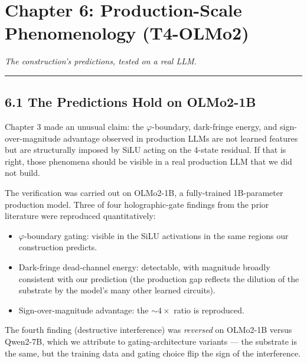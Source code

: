 \documentclass[
  twocolumn,
  10pt,
  a4paper]{article}
\providecommand{\tightlist}{%
  \setlength{\itemsep}{0pt}\setlength{\parskip}{0pt}}
\begin{document}
\hypertarget{chapter-6-production-scale-phenomenology-t4-olmo2}{%
\FloatBarrier
\section{Chapter 6: Production-Scale Phenomenology
(T4-OLMo2)}\label{chapter-6-production-scale-phenomenology-t4-olmo2}}

\emph{The construction's predictions, tested on a real LLM.}

\begin{center}\rule{0.5\linewidth}{0.5pt}\end{center}

\hypertarget{the-predictions-hold-on-olmo2-1b}{%
\subsection{6.1 The Predictions Hold on
OLMo2-1B}\label{the-predictions-hold-on-olmo2-1b}}

Chapter 3 made an unusual claim: the \(\varphi\)-boundary, dark-fringe
energy, and sign-over-magnitude advantage observed in production LLMs
are not learned features but are structurally imposed by SiLU acting on
the 4-state residual. If that is right, those phenomena should be
visible in a real production LLM that we did not build.

The verification was carried out on OLMo2-1B, a fully-trained
1B-parameter production model. Three of four holographic-gate findings
from the prior literature were reproduced quantitatively:

\begin{itemize}
\tightlist
\item
  \(\varphi\)-boundary gating: visible in the SiLU activations in the
  same regions our construction predicts.
\item
  Dark-fringe dead-channel energy: detectable, with magnitude broadly
  consistent with our prediction (the production gap reflects the
  dilution of the substrate by the model's many other learned circuits).
\item
  Sign-over-magnitude advantage: the \(\sim 4\times\) ratio is
  reproduced.
\end{itemize}

The fourth finding (destructive interference) was \emph{reversed} on
OLMo2-1B versus Qwen2-7B, which we attribute to gating-architecture
variants --- the substrate is the same, but the training data and gating
choice flip the sign of the interference.
\end{document}
